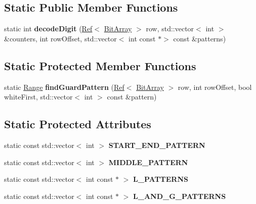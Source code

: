 \subsection*{Static Public Member Functions}
\begin{DoxyCompactItemize}
\item 
\mbox{\label{classzxing_1_1oned_1_1_u_p_c_e_a_n_reader_a2b2b6fac1d0c36a824384a0f903399c9}} 
static int {\bfseries decode\+Digit} (\mbox{\hyperlink{classzxing_1_1_ref}{Ref}}$<$ \mbox{\hyperlink{classzxing_1_1_bit_array}{Bit\+Array}} $>$ row, std\+::vector$<$ int $>$ \&counters, int row\+Offset, std\+::vector$<$ int const $\ast$$>$ const \&patterns)
\end{DoxyCompactItemize}
\subsection*{Static Protected Member Functions}
\begin{DoxyCompactItemize}
\item 
\mbox{\label{classzxing_1_1oned_1_1_u_p_c_e_a_n_reader_a3f33fe8bc94648c319daea821cb3c325}} 
static \mbox{\hyperlink{structzxing_1_1oned_1_1_one_d_reader_1_1_range}{Range}} {\bfseries find\+Guard\+Pattern} (\mbox{\hyperlink{classzxing_1_1_ref}{Ref}}$<$ \mbox{\hyperlink{classzxing_1_1_bit_array}{Bit\+Array}} $>$ row, int row\+Offset, bool white\+First, std\+::vector$<$ int $>$ const \&pattern)
\end{DoxyCompactItemize}
\subsection*{Static Protected Attributes}
\begin{DoxyCompactItemize}
\item 
\mbox{\label{classzxing_1_1oned_1_1_u_p_c_e_a_n_reader_a0ea962e61ce80fbf444cfb954b7d54dc}} 
static const std\+::vector$<$ int $>$ {\bfseries S\+T\+A\+R\+T\+\_\+\+E\+N\+D\+\_\+\+P\+A\+T\+T\+E\+RN}
\item 
\mbox{\label{classzxing_1_1oned_1_1_u_p_c_e_a_n_reader_aea1d6af1c092016443854ad9c010b405}} 
static const std\+::vector$<$ int $>$ {\bfseries M\+I\+D\+D\+L\+E\+\_\+\+P\+A\+T\+T\+E\+RN}
\item 
\mbox{\label{classzxing_1_1oned_1_1_u_p_c_e_a_n_reader_a439683fd0d985dbf55a8b42a5fff1f96}} 
static const std\+::vector$<$ int const  $\ast$ $>$ {\bfseries L\+\_\+\+P\+A\+T\+T\+E\+R\+NS}
\item 
\mbox{\label{classzxing_1_1oned_1_1_u_p_c_e_a_n_reader_adeb333757252733f7d3c7eedeca41a6a}} 
static const std\+::vector$<$ int const  $\ast$ $>$ {\bfseries L\+\_\+\+A\+N\+D\+\_\+\+G\+\_\+\+P\+A\+T\+T\+E\+R\+NS}
\end{DoxyCompactItemize}
